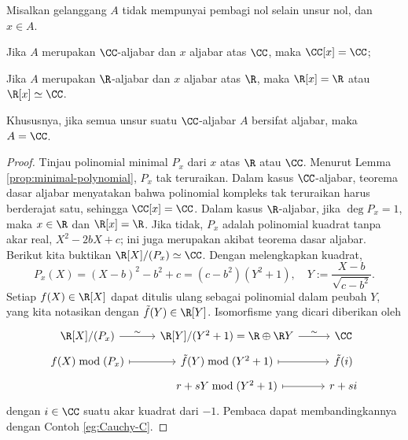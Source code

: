 \begin{lemma}\label{prop:real-extension-C}
	Misalkan gelanggang $A$ tidak mempunyai pembagi nol selain unsur nol, dan $x \in A$.
	\begin{compactenum}[(i)]
		\item Jika $A$ merupakan $\CC$-aljabar dan $x$ aljabar atas $\CC$, maka $\CC[x]=\CC$;
		\item Jika $A$ merupakan $\R$-aljabar dan $x$ aljabar atas $\R$, maka $\R[x] = \R$ atau $\R[x] \simeq \CC$.
	\end{compactenum}
	Khususnya, jika semua unsur suatu $\CC$-aljabar $A$ bersifat aljabar, maka $A=\CC$.
\end{lemma}
\begin{proof}
	Tinjau polinomial minimal $P_x$ dari $x$ atas $\R$ atau $\CC$. Menurut Lemma \ref{prop:minimal-polynomial}, $P_x$ tak teruraikan. Dalam kasus $\CC$-aljabar, teorema dasar aljabar menyatakan bahwa polinomial kompleks tak teruraikan harus berderajat satu, sehingga $\CC[x]=\CC$. Dalam kasus $\R$-aljabar, jika $\deg P_x = 1$, maka $x \in \R$ dan $\R[x] = \R$. Jika tidak, $P_x$ adalah polinomial kuadrat tanpa akar real, $X^2 -2bX + c$; ini juga merupakan akibat teorema dasar aljabar. Berikut kita buktikan $\R[X]/(P_x) \simeq \CC$. Dengan melengkapkan kuadrat,
	\[ P_x(X) = (X-b)^2 - b^2 + c = (c - b^2)(Y^2 + 1), \quad Y := \frac{X-b}{\sqrt{c - b^2}}. \]
	Setiap $f(X) \in \R[X]$ dapat ditulis ulang sebagai polinomial dalam peubah $Y$, yang kita notasikan dengan $\tilde{f}(Y) \in \R[Y]$. Isomorfisme yang dicari diberikan oleh
	\[\begin{tikzcd}[row sep=tiny]
		\R[X]/(P_x) \arrow[r, "\sim"] & \R[Y]/(Y^2+1) = \R \oplus \R Y \arrow[r, "\sim"] & \CC \\
		f(X) \bmod (P_x) \arrow[mapsto, r] & \tilde{f}(Y) \bmod (Y^2+1) \arrow[mapsto, r] & \tilde{f}(i) \\
		& r + sY \bmod (Y^2 + 1) \arrow[mapsto, r] & r + si
	\end{tikzcd}\]
	dengan $i \in \CC$ suatu akar kuadrat dari $-1$. Pembaca dapat membandingkannya dengan Contoh \ref{eg:Cauchy-C}.
\end{proof}

